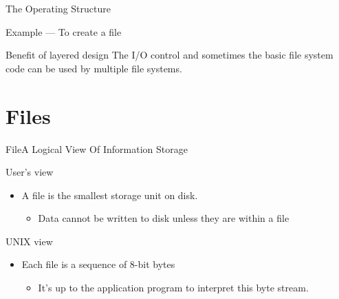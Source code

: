 \begin{frame}{The Operating Structure}
\begin{minipage}{.7\textwidth}
\begin{block}{Example --- To create a file}
\begin{enumerate}
      \end{enumerate}
    \end{block}
  \end{minipage}
  \begin{block}{Benefit of layered design}
    The I/O control and sometimes the basic file system code can be used by multiple file
    systems.
  \end{block}
\end{frame}

\section{Files}

\begin{frame}{File}{A Logical View Of Information Storage}
  \begin{block}{User's view}
    \begin{itemize}
    \item[] A file is the smallest storage unit on disk.
      \begin{itemize}
      \item Data cannot be written to disk unless they are within a file
      \end{itemize}
    \end{itemize}
  \end{block}
  \begin{block}{UNIX view}
    \begin{itemize}
    \item[] Each file is a sequence of 8-bit bytes
      \begin{itemize}
      \item It's up to the application program to interpret this byte stream.
      \end{itemize}
    \end{itemize}
  \end{block}
\end{frame}

